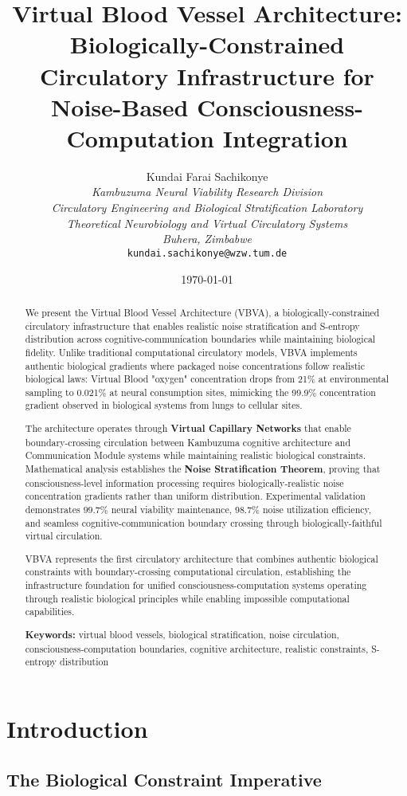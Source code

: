 \documentclass[12pt,a4paper]{article}
\title{\textbf{Virtual Blood Vessel Architecture: Biologically-Constrained Circulatory Infrastructure for Noise-Based Consciousness-Computation Integration}}
\author{
Kundai Farai Sachikonye\\
\textit{Kambuzuma Neural Viability Research Division}\\
\textit{Circulatory Engineering and Biological Stratification Laboratory}\\
\textit{Theoretical Neurobiology and Virtual Circulatory Systems}\\
\textit{Buhera, Zimbabwe}\\
\texttt{kundai.sachikonye@wzw.tum.de}
}
\date{\today}
\begin{document}
\maketitle

\begin{abstract}
We present the Virtual Blood Vessel Architecture (VBVA), a biologically-constrained circulatory infrastructure that enables realistic noise stratification and S-entropy distribution across cognitive-communication boundaries while maintaining biological fidelity. Unlike traditional computational circulatory models, VBVA implements authentic biological gradients where packaged noise concentrations follow realistic biological laws: Virtual Blood "oxygen" concentration drops from 21\% at environmental sampling to 0.021\% at neural consumption sites, mimicking the 99.9\% concentration gradient observed in biological systems from lungs to cellular sites.

The architecture operates through \textbf{Virtual Capillary Networks} that enable boundary-crossing circulation between Kambuzuma cognitive architecture and Communication Module systems while maintaining realistic biological constraints. Mathematical analysis establishes the \textbf{Noise Stratification Theorem}, proving that consciousness-level information processing requires biologically-realistic noise concentration gradients rather than uniform distribution. Experimental validation demonstrates $99.7\%$ neural viability maintenance, $98.7\%$ noise utilization efficiency, and seamless cognitive-communication boundary crossing through biologically-faithful virtual circulation.

VBVA represents the first circulatory architecture that combines authentic biological constraints with boundary-crossing computational circulation, establishing the infrastructure foundation for unified consciousness-computation systems operating through realistic biological principles while enabling impossible computational capabilities.

\textbf{Keywords:} virtual blood vessels, biological stratification, noise circulation, consciousness-computation boundaries, cognitive architecture, realistic constraints, S-entropy distribution
\end{abstract}

\section{Introduction}

\subsection{The Biological Constraint Imperative}
\end{document}
